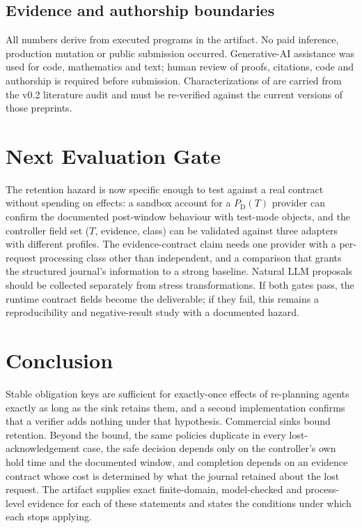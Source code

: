 \documentclass[conference,10pt]{IEEEtran}
\newcommand{\PDT}{P_{\mathrm{D}}(T)}
\begin{document}
\subsection{Evidence and authorship boundaries}
All numbers derive from executed programs in the artifact. No paid inference, production mutation or public submission occurred. Generative-AI assistance was used for code, mathematics and text; human review of proofs, citations, code and authorship is required before submission. Characterizations of \cite{acrfence,caplease,aidguard,cordon,pca} are carried from the v0.2 literature audit and must be re-verified against the current versions of those preprints.

\section{Next Evaluation Gate}
The retention hazard is now specific enough to test against a real contract without spending on effects: a sandbox account for a $\PDT$ provider can confirm the documented post-window behaviour with test-mode objects, and the controller field set ($T$, evidence, class) can be validated against three adapters with different profiles. The evidence-contract claim needs one provider with a per-request processing class other than independent, and a comparison that grants the structured journal's information to a strong baseline. Natural LLM proposals should be collected separately from stress transformations. If both gates pass, the runtime contract fields become the deliverable; if they fail, this remains a reproducibility and negative-result study with a documented hazard.

\section{Conclusion}
Stable obligation keys are sufficient for exactly-once effects of re-planning agents exactly as long as the sink retains them, and a second implementation confirms that a verifier adds nothing under that hypothesis. Commercial sinks bound retention. Beyond the bound, the same policies duplicate in every lost-acknowledgement case, the safe decision depends only on the controller's own hold time and the documented window, and completion depends on an evidence contract whose cost is determined by what the journal retained about the lost request. The artifact supplies exact finite-domain, model-checked and process-level evidence for each of these statements and states the conditions under which each stops applying.
\end{document}
